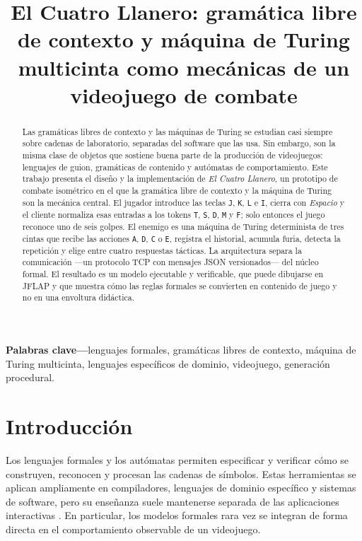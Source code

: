 \documentclass[9pt]{ieeeconf}
\title{El Cuatro Llanero: gramática libre de contexto y máquina de Turing multicinta como mecánicas de un videojuego de combate}
\begin{document}
\maketitle

\begin{abstract}
Las gramáticas libres de contexto y las máquinas de Turing se estudian casi siempre sobre cadenas de laboratorio, separadas del software que las usa. Sin embargo, son la misma clase de objetos que sostiene buena parte de la producción de videojuegos: lenguajes de guion, gramáticas de contenido y autómatas de comportamiento. Este trabajo presenta el diseño y la implementación de \emph{El Cuatro Llanero}, un prototipo de combate isométrico en el que la gramática libre de contexto y la máquina de Turing son la mecánica central. El jugador introduce las teclas \texttt{J}, \texttt{K}, \texttt{L} e \texttt{I}, cierra con \emph{Espacio} y el cliente normaliza esas entradas a los tokens \texttt{T}, \texttt{S}, \texttt{D}, \texttt{M} y \texttt{F}; solo entonces el juego reconoce uno de seis golpes. El enemigo es una máquina de Turing determinista de tres cintas que recibe las acciones \texttt{A}, \texttt{D}, \texttt{C} o \texttt{E}, registra el historial, acumula furia, detecta la repetición y elige entre cuatro respuestas tácticas. La arquitectura separa la comunicación ---un protocolo TCP con mensajes JSON versionados--- del núcleo formal. El resultado es un modelo ejecutable y verificable, que puede dibujarse en JFLAP y que muestra cómo las reglas formales se convierten en contenido de juego y no en una envoltura didáctica.
\end{abstract}

\noindent\textbf{Palabras clave---}lenguajes formales, gramáticas libres de contexto, máquina de Turing multicinta, lenguajes específicos de dominio, videojuego, generación procedural.


\section{Introducción}
\label{sec:intro}

Los lenguajes formales y los autómatas permiten especificar y verificar cómo se construyen, reconocen y procesan las cadenas de símbolos. Estas herramientas se aplican ampliamente en compiladores, lenguajes de dominio específico y sistemas de software, pero su enseñanza suele mantenerse separada de las aplicaciones interactivas \cite{chomsky1956,aho2006,scott2015}. En particular, los modelos formales rara vez se integran de forma directa en el comportamiento observable de un videojuego.
\end{document}
